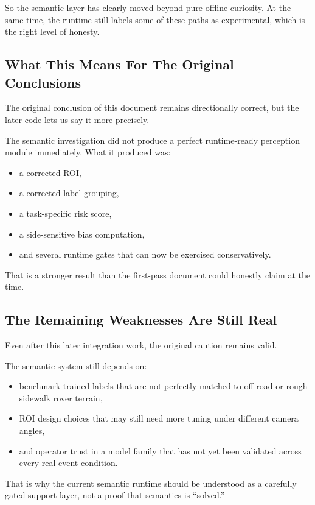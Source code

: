 \documentclass[11pt]{article}
\begin{document}
So the semantic layer has clearly moved beyond pure offline curiosity. At the same time, the runtime still labels some of these paths as experimental, which is the right level of honesty.

\subsection{What This Means For The Original Conclusions}
The original conclusion of this document remains directionally correct, but the later code lets us say it more precisely.

The semantic investigation did not produce a perfect runtime-ready perception module immediately. What it produced was:
\begin{itemize}[leftmargin=*]
\item a corrected ROI,
\item a corrected label grouping,
\item a task-specific risk score,
\item a side-sensitive bias computation,
\item and several runtime gates that can now be exercised conservatively.
\end{itemize}

That is a stronger result than the first-pass document could honestly claim at the time.

\subsection{The Remaining Weaknesses Are Still Real}
Even after this later integration work, the original caution remains valid.

The semantic system still depends on:
\begin{itemize}[leftmargin=*]
\item benchmark-trained labels that are not perfectly matched to off-road or rough-sidewalk rover terrain,
\item ROI design choices that may still need more tuning under different camera angles,
\item and operator trust in a model family that has not yet been validated across every real event condition.
\end{itemize}

That is why the current semantic runtime should be understood as a carefully gated support layer, not a proof that semantics is ``solved.''
\end{document}
